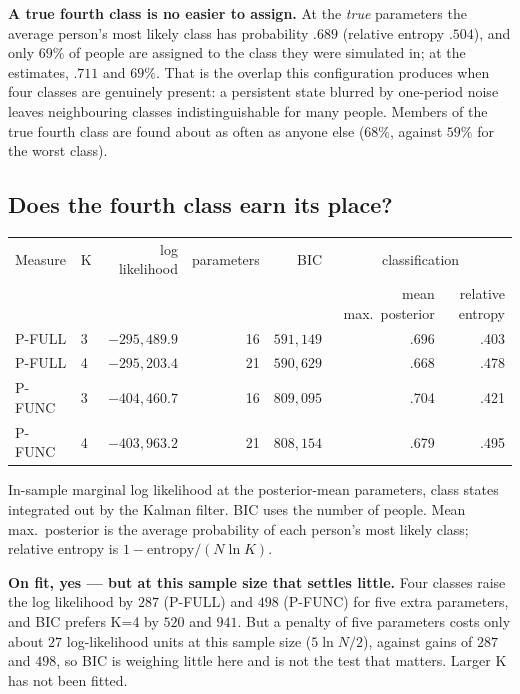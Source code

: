 \documentclass[11pt]{article}
\begin{document}
\textbf{A true fourth class is no easier to assign.} At the \emph{true}
parameters the average person's most likely class has probability $.689$
(relative entropy $.504$), and only $69\%$ of people are assigned to the class
they were simulated in; at the estimates, $.711$ and $69\%$. That is the
overlap this configuration produces when four classes are genuinely present:
a persistent state blurred by one-period noise leaves neighbouring classes
indistinguishable for many people. Members of the true fourth class are found
about as often as anyone else ($68\%$, against $59\%$ for the worst class).

\subsection*{Does the fourth class earn its place?}

\begin{center}\small
\begin{tabular}{llrrrrr}
\toprule
Measure & K & log likelihood & parameters & BIC &
\multicolumn{2}{c}{classification} \\
 & & & & & mean max.\ posterior & relative entropy \\
\midrule
P-FULL & 3 & $-295{,}489.9$ & 16 & $591{,}149$ & .696 & .403 \\
P-FULL & 4 & $-295{,}203.4$ & 21 & $590{,}629$ & .668 & .478 \\
\addlinespace
P-FUNC & 3 & $-404{,}460.7$ & 16 & $809{,}095$ & .704 & .421 \\
P-FUNC & 4 & $-403{,}963.2$ & 21 & $808{,}154$ & .679 & .495 \\
\bottomrule
\end{tabular}

{\scriptsize In-sample marginal log likelihood at the posterior-mean
parameters, class states integrated out by the Kalman filter. BIC uses the
number of people. Mean max.\ posterior is the average probability of each
person's most likely class; relative entropy is $1 - \text{entropy}/(N\ln K)$.}
\end{center}

\textbf{On fit, yes --- but at this sample size that settles little.} Four
classes raise the log likelihood by $287$ (P-FULL) and $498$ (P-FUNC) for five
extra parameters, and BIC prefers K=4 by $520$ and $941$. But a penalty of
five parameters costs only about $27$ log-likelihood units at this sample
size ($5\ln N/2$), against gains of $287$ and $498$, so BIC is weighing little here and is
not the test that matters. Larger K has not been fitted.
\end{document}
